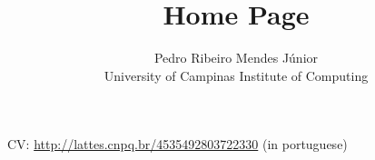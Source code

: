 \documentclass{article}
\title{Home Page}
\author{Pedro Ribeiro Mendes J\'{u}nior\\University of Campinas \textemdash{} Institute of Computing}
\begin{document}
\maketitle

CV: \url{http://lattes.cnpq.br/4535492803722330} (in portuguese)
\end{document}
